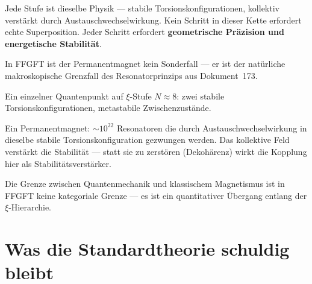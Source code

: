 \begin{center}
\end{center}

Jede Stufe ist dieselbe Physik --- stabile Torsionskonfigurationen,
kollektiv verstärkt durch Austauschwechselwirkung.
Kein Schritt in dieser Kette erfordert echte Superposition.
Jeder Schritt erfordert \textbf{geometrische Präzision und
energetische Stabilität}.

\begin{foundation}
In FFGFT ist der Permanentmagnet kein Sonderfall ---
er ist der natürliche makroskopische Grenzfall
des Resonatorprinzips aus Dokument~173.

Ein einzelner Quantenpunkt auf $\xi$-Stufe $N \approx 8$:
zwei stabile Torsionskonfigurationen, metastabile Zwischenzustände.

Ein Permanentmagnet:
$\sim 10^{22}$ Resonatoren die durch Austauschwechselwirkung
in dieselbe stabile Torsionskonfiguration gezwungen werden.
Das kollektive Feld verstärkt die Stabilität --- statt sie zu
zerstören (Dekohärenz) wirkt die Kopplung hier als
Stabilitätsverstärker.

Die Grenze zwischen Quantenmechanik und klassischem Magnetismus
ist in FFGFT keine kategoriale Grenze ---
es ist ein quantitativer Übergang entlang der $\xi$-Hierarchie.
\end{foundation}

\section{Was die Standardtheorie schuldig bleibt}
\label{sec:schuldig}

